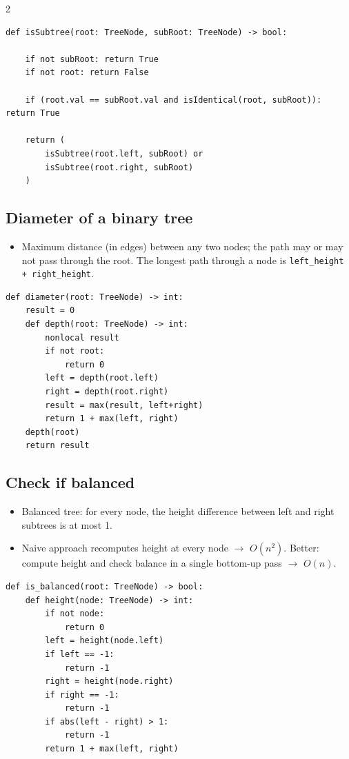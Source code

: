 \documentclass[9pt,a4paper]{extarticle}
\newlength{\tw}
\begin{document}
\begin{multicols}{2}
\begin{lstlisting}
def isSubtree(root: TreeNode, subRoot: TreeNode) -> bool:

    if not subRoot: return True
    if not root: return False

    if (root.val == subRoot.val and isIdentical(root, subRoot)): return True

    return (
        isSubtree(root.left, subRoot) or
        isSubtree(root.right, subRoot)
    )
\end{lstlisting}

\subsection{Diameter of a binary tree}

\begin{itemize}
\item Maximum distance (in edges) between any two nodes; the path may or may not pass through the root. The longest path through a node is \texttt{left\_\allowbreak{}height +\allowbreak{} right\_\allowbreak{}height}.
\end{itemize}

\begin{lstlisting}
def diameter(root: TreeNode) -> int:
    result = 0
    def depth(root: TreeNode) -> int:
        nonlocal result
        if not root:
            return 0
        left = depth(root.left)
        right = depth(root.right)
        result = max(result, left+right)
        return 1 + max(left, right)
    depth(root)
    return result
\end{lstlisting}

\subsection{Check if balanced}

\begin{itemize}
\item Balanced tree: for every node, the height difference between left and right subtrees is at most 1.
\item Naive approach recomputes height at every node $\to$ $O(n^2)$. Better: compute height and check balance in a single bottom-up pass $\to$ $O(n)$.
\end{itemize}

\begin{lstlisting}
def is_balanced(root: TreeNode) -> bool:
    def height(node: TreeNode) -> int:
        if not node:
            return 0
        left = height(node.left)
        if left == -1:
            return -1
        right = height(node.right)
        if right == -1:
            return -1
        if abs(left - right) > 1:
            return -1
        return 1 + max(left, right)


\end{lstlisting}
\end{multicols}
\end{document}
